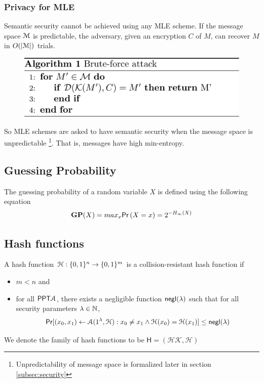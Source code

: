 \subsubsection{Privacy for MLE}
Semantic security cannot be achieved using any MLE scheme. If the message space $\mathcal{M}$ is predictable,
the adversary, given an encryption $C$ of $M$, can recover $M$ in $O(|\mathcal{M}|)$ trials.\\
\begin{figure}[H]
	\centering
	\includegraphics[scale=0.25]{brute}
\end{figure}
So MLE schemes are asked to have semantic security when the message space is unpredictable
\footnote{Unpredictability of message space is formalized later in section \ref{subsec:security}}. 
That is, messages have high min-entropy.

\subsection{Guessing Probability}
The guessing probability of a random variable $X$ is defined using the following equation
\begin{equation}
\textbf{GP}(X) = max_x \mathsf{Pr}\left(X=x\right) = 2^{-H_\infty(X)}
\end{equation}


\subsection{Hash functions}
A hash function $\mathcal{H}: \{0,1\}^n \rightarrow \{0,1\}^m$ is a collision-resistant hash function if
\begin{itemize}
	\item $m < n$ and
	\item for all $\mathsf{PPT} \mathcal{A}$, there exists a negligible function $\mathsf{negl}(\lambda)$ such that for all security parameters $\lambda \in \mathbb{N}$,
	\begin{equation*}
	\mathsf{Pr} [ ( x_0, x_1) \leftarrow \mathcal{A} ( 1^{\lambda}, \mathcal{H} ): 
	x_0 \neq x_1 \wedge \mathcal{H} ( x_0 ) = \mathcal{H}(x_1) ] \leq \mathsf{negl}(\lambda)
	\end{equation*}
\end{itemize}
We denote the family of hash functions to be $\mathsf{H} = ( \mathcal{HK, H} )$

